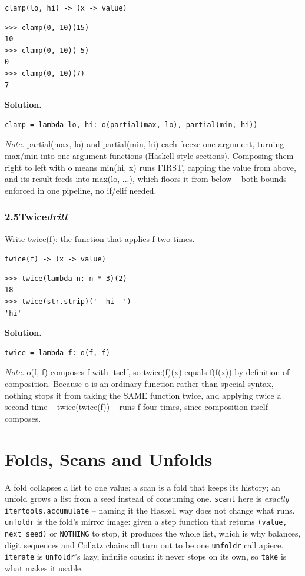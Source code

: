 \documentclass[10pt,letterpaper]{book}
\begin{document}
\noindent\texttt{clamp(lo, hi) -> (x -> value)}
\begin{lstlisting}[style=ex]
>>> clamp(0, 10)(15)
10
>>> clamp(0, 10)(-5)
0
>>> clamp(0, 10)(7)
7
\end{lstlisting}
\noindent\textbf{Solution.}
\begin{lstlisting}[style=code]
clamp = lambda lo, hi: o(partial(max, lo), partial(min, hi))
\end{lstlisting}
\noindent\textit{Note.} partial(max, lo) and partial(min, hi) each freeze one argument, turning max/min into one-argument functions (Haskell-style sections). Composing them right to left with o means min(hi, x) runs FIRST, capping the value from above, and its result feeds into max(lo, ...), which floors it from below -- both bounds enforced in one pipeline, no if/elif needed.

\subsection*{2.5\quad Twice\hfill\textnormal{\textit{drill}}}
Write twice(f): the function that applies f two times.

\noindent\texttt{twice(f) -> (x -> value)}
\begin{lstlisting}[style=ex]
>>> twice(lambda n: n * 3)(2)
18
>>> twice(str.strip)('  hi  ')
'hi'
\end{lstlisting}
\noindent\textbf{Solution.}
\begin{lstlisting}[style=code]
twice = lambda f: o(f, f)
\end{lstlisting}
\noindent\textit{Note.} o(f, f) composes f with itself, so twice(f)(x) equals f(f(x)) by definition of composition. Because o is an ordinary function rather than special syntax, nothing stops it from taking the SAME function twice, and applying twice a second time -- twice(twice(f)) -- runs f four times, since composition itself composes.

\clearpage
\chapter{Folds, Scans and Unfolds}

A fold collapses a list to one value; a scan is a fold that keeps its
history; an unfold grows a list from a seed instead of consuming one.
\texttt{scanl} here is \emph{exactly} \texttt{itertools.accumulate} --
naming it the Haskell way does not change what runs. \texttt{unfoldr} is
the fold's mirror image: given a step function that returns
\texttt{(value, next\_seed)} or \texttt{NOTHING} to stop, it produces the
whole list, which is why balances, digit sequences and Collatz chains all
turn out to be one \texttt{unfoldr} call apiece. \texttt{iterate} is
\texttt{unfoldr}'s lazy, infinite cousin: it never stops on its own, so
\texttt{take} is what makes it usable.
\end{document}
